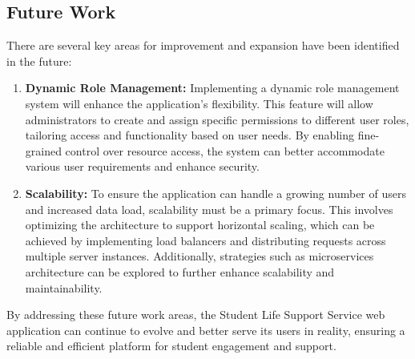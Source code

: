 \subsection{Future Work}
There are several key areas for improvement and expansion have been identified in the future:

	\begin{enumerate}
		\item \textbf{Dynamic Role Management:} Implementing a dynamic role management system will enhance the application’s flexibility. This feature will allow administrators to create and assign specific permissions to different user roles, tailoring access and functionality based on user needs. By enabling fine-grained control over resource access, the system can better accommodate various user requirements and enhance security.
		
		\item \textbf{Scalability:} To ensure the application can handle a growing number of users and increased data load, scalability must be a primary focus. This involves optimizing the architecture to support horizontal scaling, which can be achieved by implementing load balancers and distributing requests across multiple server instances. Additionally, strategies such as microservices architecture can be explored to further enhance scalability and maintainability.
		
	\end{enumerate}
	
\noindent By addressing these future work areas, the Student Life Support Service web application can continue to evolve and better serve its users in reality, ensuring a reliable and efficient platform for student engagement and support.

